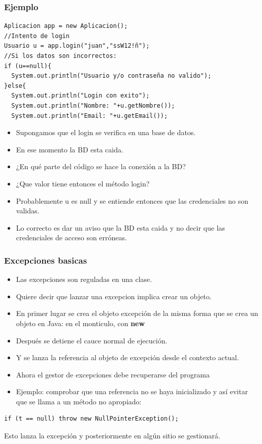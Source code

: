 \documentclass{beamer}
\begin{document}
\begin{frame}[fragile]
\frametitle{Ejemplo}
\begin{small}
\begin{verbatim}
Aplicacion app = new Aplicacion();
//Intento de login
Usuario u = app.login("juan","ssW12!ñ");
//Si los datos son incorrectos:
if (u==null){
  System.out.println("Usuario y/o contraseña no valido");
}else{
  System.out.println("Login con exito");
  System.out.println("Nombre: "+u.getNombre());
  System.out.println("Email: "+u.getEmail());
\end{verbatim}
\end{small}
\pause
\begin{footnotesize}
\begin{itemize}[<+->]
\item Supongamos que el login se verifica en una base de datos.
\item En ese momento la BD esta caida.
\item ¿En qué parte del código se hace la conexión a la BD?
\item ¿Que valor tiene entonces el método login?
\item Probablemente u es null y se entiende entonces que las credenciales no son validas.
\item Lo correcto es dar un aviso que la BD esta caida y no decir que las credenciales de acceso  son erróneas.
\end{itemize}
\end{footnotesize}
\end{frame}

 
\begin{frame}[fragile]
\frametitle{Excepciones basicas}
\begin{itemize}[<+->]
\item Las excepciones son reguladas en una clase.
\item Quiere decir que lanzar una excepcion implica crear un objeto.
\item En primer lugar se crea el objeto excepción  de la misma forma que se crea un objeto en Java: en el monticulo, con \bf{new}
\item Después se detiene el cauce normal de ejecución.
\item Y se lanza la referencia al objeto de excepción desde el contexto actual.
\item Ahora el gestor de excepciones debe recuperarse del programa
\item Ejemplo: comprobar que una referencia no se haya inicializado y así evitar que se llama a un método no apropiado:
\end{itemize}
\pause
\begin{verbatim}
if (t == null) throw new NullPointerException();
\end{verbatim}
Esto lanza la excepción y posteriormente en algún sitio se gestionará.
\end{frame}
\end{document}
